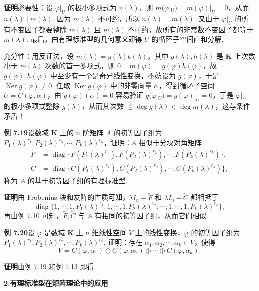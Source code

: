 \documentclass[UTF8, 12pt, fontset=fandol, oneside]{ctexart}
\begin{document}
\noindent\textbf{证明}\quad 必要性：设 $\varphi|_U$ 的极小多项式为 $n(\lambda)$，则 $m(\varphi|_U)=m(\varphi)|_U=0$，从而 $n(\lambda)\mid m(\lambda)$. 因为 $m(\lambda)$ 不可约，所以 $n(\lambda)=m(\lambda)$. 又由于 $\varphi|_U$ 的所有不变因子都要整除 $m(\lambda)$ 且 $m(\lambda)$ 不可约，故所有的非常数不变因子都等于 $m(\lambda)$. 最后，由有理标准型的几何意义即得 $U$ 的循环子空间直和分解.

充分性：用反证法，设 $m(\lambda)=g(\lambda)h(\lambda)$，其中 $g(\lambda),h(\lambda)$ 是 $\mathbf{K}$ 上次数小于 $m(\lambda)$ 次数的首一多项式，则 $0=m(\varphi)=g(\varphi)h(\varphi)$，故 $g(\varphi),h(\varphi)$ 中至少有一个是奇异线性变换，不妨设为 $g(\varphi)$，于是 $\operatorname{Ker}g(\varphi)\ne 0$. 任取 $\operatorname{Ker}g(\varphi)$ 中的非零向量 $\alpha$，得到循环子空间 $U=C(\varphi,\alpha)$，由 $g(\varphi)(\alpha)=0$ 容易验证 $g(\varphi|_U)=g(\varphi)|_U=0$，于是 $\varphi|_U$ 的极小多项式整除 $g(\lambda)$，从而其次数 $\le\deg g(\lambda)<\deg m(\lambda)$，这与条件矛盾！

\noindent\textbf{例 7.19}\quad 设数域 $\mathbf{K}$ 上的 $n$ 阶矩阵 $A$ 的初等因子组为 $P_1(\lambda)^{r_1},P_2(\lambda)^{r_2},\cdots,P_k(\lambda)^{r_k}$，证明：$A$ 相似于分块对角矩阵
\[
\begin{array}{rl}
\widetilde{F}&=\operatorname{diag}\{F(P_1(\lambda)^{r_1}),F(P_2(\lambda)^{r_2}),\cdots,F(P_k(\lambda)^{r_k})\},\\
\widetilde{C}&=\operatorname{diag}\{C(P_1(\lambda)^{r_1}),C(P_2(\lambda)^{r_2}),\cdots,C(P_k(\lambda)^{r_k})\},
\end{array}
\]
称为 $A$ 的基于初等因子组的有理标准型.

\noindent\textbf{证明}\quad 由 Frobenius 块和友阵的性质可知，$\lambda I_n-\widetilde{F}$ 和 $\lambda I_n-\widetilde{C}$ 都相抵于
\[
\operatorname{diag}\{1,\cdots,1,P_1(\lambda)^{r_1};1,\cdots,1,P_2(\lambda)^{r_2};\cdots;1,\cdots,1,P_k(\lambda)^{r_k}\},
\]
再由例 7.10 可知，$\widetilde{F},\widetilde{C}$ 与 $A$ 有相同的初等因子组，从而它们相似.

\noindent\textbf{例 7.20}\quad 设 $\varphi$ 是数域 $\mathbf{K}$ 上 $n$ 维线性空间 $V$ 上的线性变换，$\varphi$ 的初等因子组为 $P_1(\lambda)^{r_1},P_2(\lambda)^{r_2},\cdots,P_k(\lambda)^{r_k}$. 证明：存在 $\alpha_1,\alpha_2,\cdots,\alpha_k\in V$，使得
\[
V=C(\varphi,\alpha_1)\oplus C(\varphi,\alpha_2)\oplus\cdots\oplus C(\varphi,\alpha_k).
\]

\noindent\textbf{证明}\quad 由例 7.19 和例 7.13 即得.

\noindent\textbf{2.\quad 有理标准型在矩阵理论中的应用}
\end{document}
